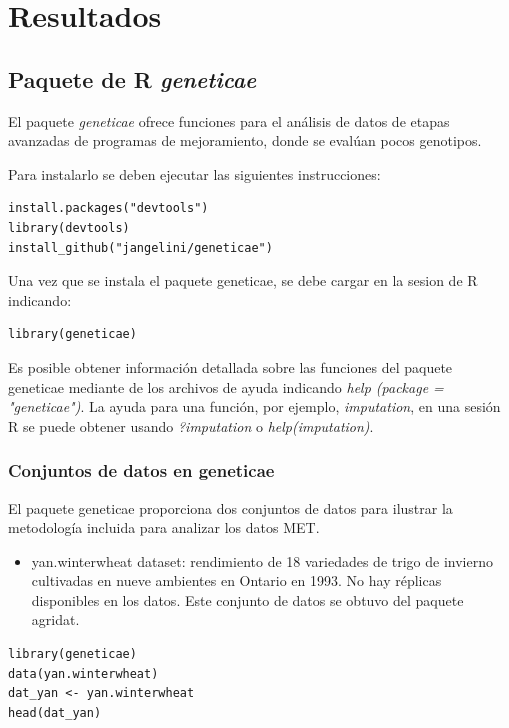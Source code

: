 \chapter{Resultados}
\section{Paquete de R \emph{geneticae}}

El paquete \emph{geneticae} ofrece funciones para el análisis de datos de etapas avanzadas de programas de mejoramiento, donde se evalúan pocos genotipos. 

Para instalarlo se deben ejecutar las siguientes instrucciones:

\begin{lstlisting}
install.packages("devtools")
library(devtools)
install_github("jangelini/geneticae")
\end{lstlisting}

Una vez que se instala el paquete geneticae, se debe cargar en la sesion de R indicando:

\begin{lstlisting}
library(geneticae)
\end{lstlisting}


Es posible obtener información detallada sobre las funciones del paquete geneticae mediante de los archivos de ayuda indicando \emph{help (package = "geneticae")}.  La ayuda para una función, por ejemplo, \emph{imputation}, en una sesión R se puede obtener usando \emph{?imputation} o \emph{help(imputation)}.


\subsection{Conjuntos de datos en geneticae}

El paquete geneticae proporciona dos conjuntos de datos para ilustrar la metodología incluida para analizar los datos MET.

\begin{itemize}
\item yan.winterwheat dataset: rendimiento de 18 variedades de trigo de invierno cultivadas en nueve ambientes en Ontario en 1993. No hay réplicas disponibles en los datos. Este conjunto de datos se obtuvo del paquete agridat.
\end{itemize}
\begin{lstlisting}
library(geneticae)
data(yan.winterwheat)
dat_yan <- yan.winterwheat
head(dat_yan)
\end{lstlisting}

